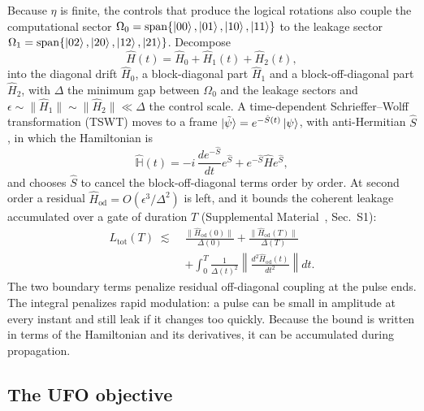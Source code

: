 \documentclass[aps,prx,twocolumn,superscriptaddress,nofootinbib,amsmath,amssymb,floatfix]{revtex4-2}
\newcommand{\Ltot}{L_{\mathrm{tot}}}
\newcommand{\Hod}{\hat{H}_{\mathrm{od}}}
\begin{document}
Because $\eta$ is finite, the controls that produce the logical rotations also couple the computational
sector $\Omega_0=\mathrm{span}\{\ket{00},\ket{01},\ket{10},\ket{11}\}$ to the leakage sector
$\Omega_1=\mathrm{span}\{\ket{02},\ket{20},\ket{12},\ket{21}\}$. Decompose
\begin{equation}
\hat{H}(t)=\hat{H}_0+\hat{H}_1(t)+\hat{H}_2(t),
\label{eq:decomp}
\end{equation}
into the diagonal drift $\hat H_0$, a block-diagonal part $\hat H_1$ and a block-off-diagonal part
$\hat H_2$, with $\Delta$ the minimum gap between $\Omega_0$ and the leakage sectors and
$\epsilon\sim\|\hat H_1\|\sim\|\hat H_2\|\ll\Delta$ the control scale. A time-dependent Schrieffer--Wolff
transformation (TSWT) moves to a frame $\ket{\tilde\psi}=e^{-\hat S(t)}\ket{\psi}$, with anti-Hermitian
$\hat S$, in which the Hamiltonian is
\begin{equation}
\hat{\mathbb{H}}(t)=-i\,\frac{d e^{-\hat{S}}}{dt}e^{\hat{S}} + e^{-\hat{S}}\hat{H}e^{\hat{S}},
\label{eq:tswt}
\end{equation}
and chooses $\hat S$ to cancel the block-off-diagonal terms order by order. At second order a residual
$\Hod=O(\epsilon^3/\Delta^2)$ is left, and it bounds the coherent leakage accumulated over a gate of
duration $T$ (Supplemental Material~\cite{supp}, Sec.~S1):
\begin{align}
\Ltot(T)\;\lesssim\;&
\frac{\|\Hod(0)\|}{\Delta(0)}+\frac{\|\Hod(T)\|}{\Delta(T)}
\nonumber\\
&+\int_{0}^{T}\frac{1}{\Delta(t)^{2}}\left\|\frac{d^{2}\Hod(t)}{dt^{2}}\right\|dt .
\label{eq:leakbound}
\end{align}
The two boundary terms penalize residual off-diagonal coupling at the pulse ends. The integral penalizes
rapid modulation: a pulse can be small in amplitude at every instant and still leak if it changes too
quickly. Because the bound is written in terms of the Hamiltonian and its derivatives, it can be
accumulated during propagation.

\subsection{The UFO objective}
\label{sec:ufo}
\end{document}
